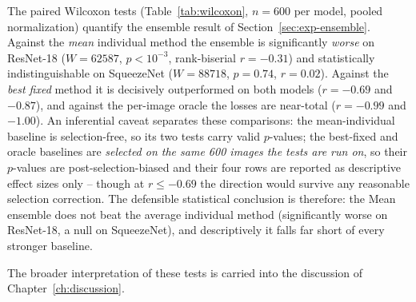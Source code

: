 The paired Wilcoxon tests (Table~\ref{tab:wilcoxon}, $n = 600$ per model,
pooled normalization)
quantify the ensemble result of Section~\ref{sec:exp-ensemble}. Against the
\emph{mean} individual method the ensemble is
significantly \emph{worse} on ResNet-18 ($W = 62587$, $p < 10^{-3}$,
rank-biserial $r = -0.31$) and statistically indistinguishable on SqueezeNet
($W = 88718$, $p = 0.74$, $r = 0.02$). Against
the \emph{best fixed} method it is decisively outperformed on both models
($r = -0.69$ and $-0.87$), and against the per-image oracle the losses are
near-total ($r = -0.99$ and $-1.00$). An inferential caveat separates
these comparisons: the mean-individual baseline is selection-free, so its
two tests carry valid $p$-values; the best-fixed and oracle baselines are
\emph{selected on the same 600 images the tests are run on}, so their
$p$-values are post-selection-biased and their four rows are reported as
descriptive effect sizes only -- though at $r \le -0.69$ the direction
would survive any reasonable selection correction. The defensible
statistical conclusion is therefore: the Mean ensemble does not beat the
average individual method (significantly worse on ResNet-18, a null on
SqueezeNet), and descriptively it falls far short of every stronger
baseline.

The broader interpretation of these tests is carried into the discussion of
Chapter~\ref{ch:discussion}.
